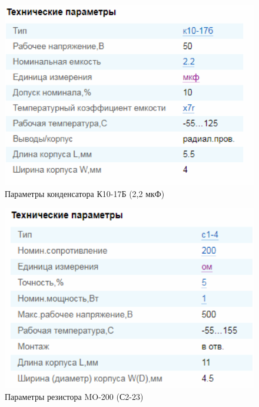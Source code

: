 \begin{figure}[h!]
	\centering
	\caption{Параметры конденсатора К10-17Б (2,2 мкФ)}
	\includegraphics{images/3.png}
\end{figure}

\begin{figure}[h!]
	\centering
	\caption{Параметры резистора MO-200 (С2-23)}
	\includegraphics{images/4.png}
\end{figure}
